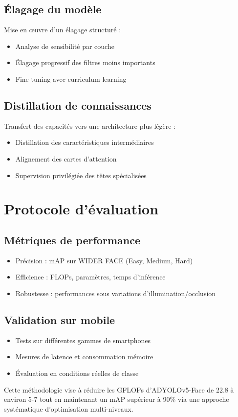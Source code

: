 \begin{onehalfspace}
\subsection{Élagage du modèle}
\hspace{0.65cm} Mise en œuvre d'un élagage structuré :
\begin{itemize}
    \item Analyse de sensibilité par couche
    \item Élagage progressif des filtres moins importants
    \item Fine-tuning avec curriculum learning
\end{itemize}

\subsection{Distillation de connaissances}
\hspace{0.65cm} Transfert des capacités vers une architecture plus légère :
\begin{itemize}
    \item Distillation des caractéristiques intermédiaires
    \item Alignement des cartes d'attention
    \item Supervision privilégiée des têtes spécialisées
\end{itemize}

\section{Protocole d'évaluation}

\subsection{Métriques de performance}
\begin{itemize}
    \item Précision : mAP sur WIDER FACE (Easy, Medium, Hard)
    \item Efficience : FLOPs, paramètres, temps d'inférence
    \item Robustesse : performances sous variations d'illumination/occlusion
\end{itemize}

\subsection{Validation sur mobile}
\begin{itemize}
    \item Tests sur différentes gammes de smartphones
    \item Mesures de latence et consommation mémoire
    \item Évaluation en conditions réelles de classe
\end{itemize}

\hspace{0.65cm} Cette méthodologie vise à réduire les GFLOPs d'ADYOLOv5-Face de 22.8 à environ 5-7 tout en maintenant un mAP supérieur à 90\% via une approche systématique d'optimisation multi-niveaux.


\end{onehalfspace} 